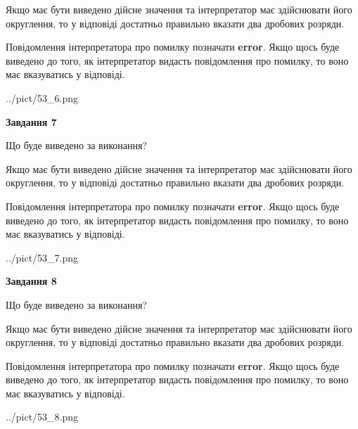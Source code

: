 \documentclass[12pt, ukrainian]{article}
\begin{document}
{\begin {Large}
Якщо має бути виведено дійсне значення та інтерпретатор має здійснювати його округлення, 
то у відповіді достатньо правильно вказати два дробових розряди.

Повідомлення інтерпретатора про помилку позначати \textbf{error}.
Якщо щось буде виведено до того, як інтерпретатор видасть повідомлення про помилку, 
то воно має вказуватись у відповіді. \par

\begin{center}
	{../pict/53_6.png}
\end{center}
\newpage

{\begin {center}\textbf{Завдання 7}\end {center}}\par
Що буде виведено за виконання? \par

Якщо має бути виведено дійсне значення та інтерпретатор має здійснювати його округлення, 
то у відповіді достатньо правильно вказати два дробових розряди.

Повідомлення інтерпретатора про помилку позначати \textbf{error}.
Якщо щось буде виведено до того, як інтерпретатор видасть повідомлення про помилку, 
то воно має вказуватись у відповіді. \par

\begin{center}
	{../pict/53_7.png}
\end{center}
\newpage

{\begin {center}\textbf{Завдання 8}\end {center}}\par
Що буде виведено за виконання? \par

Якщо має бути виведено дійсне значення та інтерпретатор має здійснювати його округлення, 
то у відповіді достатньо правильно вказати два дробових розряди.

Повідомлення інтерпретатора про помилку позначати \textbf{error}.
Якщо щось буде виведено до того, як інтерпретатор видасть повідомлення про помилку, 
то воно має вказуватись у відповіді. \par

\begin{center}
	{../pict/53_8.png}
\end{center}
\newpage


\end{Large}}
\end{document}
